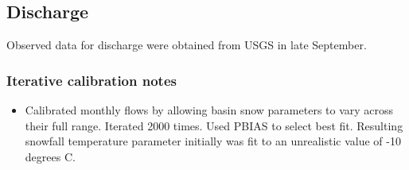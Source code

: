 \subsection{Discharge}
Observed data for discharge were obtained from USGS in late September.

\subsubsection{Iterative calibration notes}
\begin{itemize}
	\item Calibrated monthly flows by allowing basin snow parameters to vary across their full range. Iterated 2000 times. Used PBIAS to select best fit. Resulting snowfall temperature parameter initially was fit to an unrealistic value of -10 degrees C.
\end{itemize}
\pagebreak
